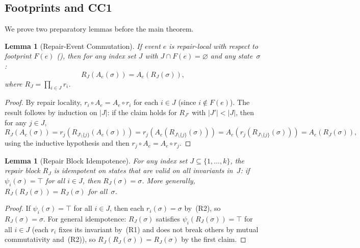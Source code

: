 \documentclass[11pt,a4paper]{article}
\theoremstyle{plain}
\newtheorem{lemma}[theorem]{Lemma}
\theoremstyle{definition}
\theoremstyle{remark}
\begin{document}
\subsection{Footprints and CC1}

We prove two preparatory lemmas before the main theorem.

\begin{lemma}[Repair-Event Commutation]
\label{lem:repair-commute}
If event $e$ is repair-local with respect to footprint $F(e)$
(), then for any index set $J$ with
$J \cap F(e) = \varnothing$ and any state~$\sigma$:
\[
R_J(A_e(\sigma)) = A_e(R_J(\sigma)),
\]
where $R_J = \prod_{i \in J} r_i$.
\end{lemma}

\begin{proof}
By repair locality, $r_i \circ A_e = A_e \circ r_i$ for each $i \in J$
(since $i \notin F(e)$).  The result follows by induction on $|J|$: if the
claim holds for $R_{J'}$ with $|J'| < |J|$, then for any $j \in J$,
\[
R_J(A_e(\sigma)) = r_j(R_{J \setminus \{j\}}(A_e(\sigma)))
= r_j(A_e(R_{J \setminus \{j\}}(\sigma)))
= A_e(r_j(R_{J \setminus \{j\}}(\sigma)))
= A_e(R_J(\sigma)),
\]
using the inductive hypothesis and then $r_j \circ A_e = A_e \circ r_j$.
\end{proof}

\begin{lemma}[Repair Block Idempotence]
\label{lem:repair-idempotent}
For any index set $J \subseteq \{1,\ldots,k\}$, the repair block $R_J$ is
idempotent on states that are valid on all invariants in~$J$: if
$\psi_i(\sigma) = \top$ for all $i \in J$, then $R_J(\sigma) = \sigma$.
More generally, $R_J(R_J(\sigma)) = R_J(\sigma)$ for all~$\sigma$.
\end{lemma}

\begin{proof}
If $\psi_i(\sigma) = \top$ for all $i \in J$, then each $r_i(\sigma) = \sigma$
by~(R2), so $R_J(\sigma) = \sigma$.  For general idempotence: $R_J(\sigma)$
satisfies $\psi_i(R_J(\sigma)) = \top$ for all $i \in J$ (each $r_i$ fixes its
invariant by~(R1) and does not break others by mutual commutativity and~(R2)),
so $R_J(R_J(\sigma)) = R_J(\sigma)$ by the first claim.
\end{proof}
\end{document}
